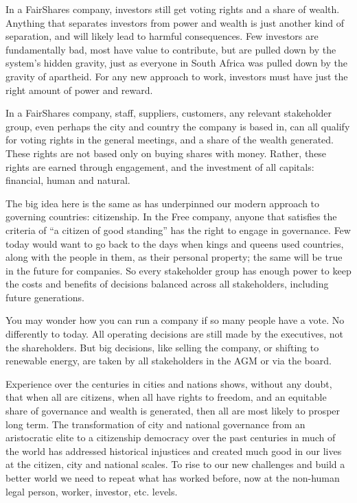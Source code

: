 In a FairShares company, investors still get voting rights and a share of wealth. Anything that separates investors from power and wealth is just another kind of separation, and will likely lead to harmful consequences. Few investors are fundamentally bad, most have value to contribute, but are pulled down by the system’s hidden gravity, just as everyone in South Africa was pulled down by the gravity of apartheid. For any new approach to work, investors must have just the right amount of power and reward.


In a FairShares company, staff, suppliers, customers, any relevant stakeholder group, even perhaps the city and country the company is based in, can all qualify for voting rights in the general meetings, and a share of the wealth generated. These rights are not based only on buying shares with money. Rather, these rights are earned through engagement, and the investment of all capitals: financial, human and natural.


The big idea here is the same as has underpinned our modern approach to governing countries: citizenship. In the Free company, anyone that satisfies the criteria of “a citizen of good standing” has the right to engage in governance. Few today would want to go back to the days when kings and queens used countries, along with the people in them, as their personal property; the same will be true in the future for companies. So every stakeholder group has enough power to keep the costs and benefits of decisions balanced across all stakeholders, including future generations.


You may wonder how you can run a company if so many people have a vote. No differently to today. All operating decisions are still made by the executives, not the shareholders. But big decisions, like selling the company, or shifting to renewable energy, are taken by all stakeholders in the AGM or via the board.


Experience over the centuries in cities and nations shows, without any doubt, that when all are citizens, when all have rights to freedom, and an equitable share of governance and wealth is generated, then all are most likely to prosper long term. The transformation of city and national governance from an aristocratic elite to a citizenship democracy over the past centuries in much of the world has addressed historical injustices and created much good in our lives at the citizen, city and national scales. To rise to our new challenges and build a better world we need to repeat what has worked before, now at the non-human legal person, worker, investor, etc. levels.


